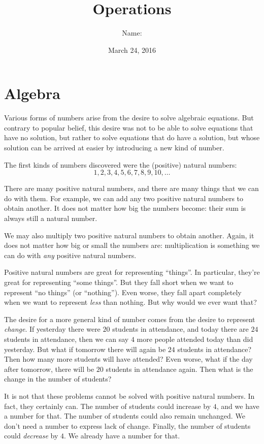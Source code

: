 \documentclass[12pt,a4paper]{article}
\title{Operations}
\author{Name: \underline{\hspace{6cm}}}
\date{March 24, 2016}
\begin{document}
\maketitle

\section{Algebra}

Various forms of numbers arise from the desire to solve algebraic equations. But
contrary to popular belief, this desire was not to be able to solve equations
that have no solution, but rather to solve equations that do have a solution,
but whose solution can be arrived at easier by introducing a new kind of number.

The first kinds of numbers discovered were the (positive) natural numbers: \[ 1,
2, 3, 4, 5, 6, 7, 8, 9, 10, \dots \]

There are many positive natural numbers, and there are many things that we can
do with them. For example, we can add any two positive natural numbers to obtain
another. It does not matter how big the numbers become: their sum is always
still a natural number.

We may also multiply two positive natural numbers to obtain another. Again, it
does not matter how big or small the numbers are: multiplication is something
we can do with \emph{any} positive natural numbers.

Positive natural numbers are great for representing ``things''. In particular,
they're great for representing ``some things''. But they fall short when we want
to represent ``no things'' (or ``nothing''). Even worse, they fall apart
completely when we want to represent \emph{less} than nothing. But why would we
ever want that?

The desire for a more general kind of number comes from the desire to represent
\emph{change}. If yesterday there were $20$ students in attendance, and today
there are $24$ students in attendance, then we can say $4$ more people attended
today than did yesterday. But what if tomorrow there will again be $24$ students
in attendance? Then how many more students will have attended? Even worse, what
if the day after tomorrow, there will be $20$ students in attendance again. Then
what is the change in the number of students?

It is not that these problems cannot be solved with positive natural numbers. In
fact, they certainly can. The number of students could increase by $4$, and we
have a number for that. The number of students could also remain unchanged. We
don't need a number to express lack of change. Finally, the number of students
could \emph{decrease} by $4$. We already have a number for that.
\end{document}
